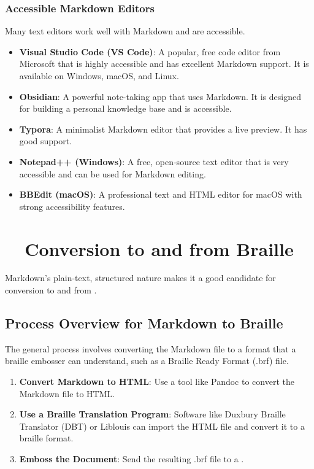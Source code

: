 \subsubsection{Accessible Markdown Editors}
\label{ssubsec:accessible-markdown-editors-details}
Many text editors work well with Markdown and are accessible.
\begin{itemize}
	\item \textbf{Visual Studio Code (VS Code)}: A popular, free code editor from Microsoft that is highly accessible and has excellent Markdown support. It is available on Windows, macOS, and Linux.
	\item \textbf{Obsidian}: A powerful note-taking app that uses Markdown. It is designed for building a personal knowledge base and is accessible.
	\item \textbf{Typora}: A minimalist Markdown editor that provides a live preview. It has good  support.
	\item \textbf{Notepad++ (Windows)}: A free, open-source text editor that is very accessible and can be used for Markdown editing.
	\item \textbf{BBEdit (macOS)}: A professional text and HTML editor for macOS with strong accessibility features.
\end{itemize}

\section{~~Conversion to and from Braille}
\label{sec:markdown-braille-conversion}
Markdown's plain-text, structured nature makes it a good candidate for conversion to and from .

\subsection{Process Overview for Markdown to Braille}
\label{subsec:markdown-to-braille}
The general process involves converting the Markdown file to a format that a \gls{braille} embosser can understand, such as a \gls{Braille Ready Format} (.brf) file.
\begin{enumerate}
	\item \textbf{Convert Markdown to HTML}: Use a tool like Pandoc to convert the Markdown file to HTML.
	\item \textbf{Use a Braille Translation Program}: Software like Duxbury Braille Translator (DBT) or Liblouis can import the HTML file and convert it to a braille format.
	\item \textbf{Emboss the Document}: Send the resulting .brf file to a .
\end{enumerate}

